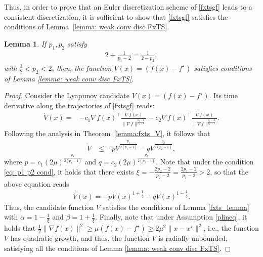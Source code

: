 \documentclass[letterpaper]{article}
\newtheorem{lemma}{Lemma} %
\begin{document}
Thus, in order to prove that an Euler discretization scheme of \eqref{fxtsgf} leads to a consistent discretization, it is sufficient to show that \eqref{fxtsgf} satisfies the conditions of Lemma~\ref{lemma: weak conv disc FxTS}.

\begin{lemma}\label{lemma:V p1 p2}
If $p_1, p_2$ satisfy
\begin{align}\label{eq: p1 p2 cond}
 2 + \frac{1}{p_1-2}  = \frac{1}{2-p_2},
\end{align}
with $\frac{3}{2}<p_2<2$, then, the function $V(x) = (f(x)-f^\star)$ satisfies conditions of Lemma \ref{lemma: weak conv disc FxTS}.
\end{lemma}
\begin{proof}
Consider the Lyapunov candidate $V(x) = (f(x)-f^\star)$. Its time derivative along the trajectories of \eqref{fxtsgf} reads:
\begin{align*}
    \dot V(x) =& -c_1\nabla f(x)^\intercal \frac{\nabla f(x)}{\|\nabla f\|^{\frac{p_2-2}{p_2-1}}}-c_2\nabla f(x)^\intercal \frac{\nabla f(x)}{\|\nabla f\|^{\frac{p_1-2}{p_1-1}}}.
\end{align*}
Following the analysis in Theorem~\ref{lemma:fxts_V}, it follows that
\begin{align*}
\dot{V} &\leq -pV^{\frac{p_1}{2(p_1-1)}} -q V^{\frac{p_2}{2(p_2-1)}},
\end{align*}
where $p= c_1 (2\mu)^{\frac{p_1}{2(p_1-1)}}$ and $q=c_2 (2\mu)^{\frac{p_2}{2(p_2-1)}}$. Note that under the condition \eqref{eq: p1 p2 cond}, it holds that there exists $\xi = -\frac{2p_2-2}{p_2-2} = \frac{2p_1-2}{p_1-2}>2$, so that the above equation reads
\begin{align*}
    \dot V(x) = -pV(x)^{1+\frac{1}{\xi}}
    -qV(x)^{1-\frac{1}{\xi}}.
\end{align*}
Thus, the candidate function $V$ satisfies the conditions of Lemma \ref{fxts_lemma} with $\alpha = 1-\frac{1}{\xi}$ and $\beta = 1+\frac{1}{\xi}$. Finally, note that under Assumption \ref{plineq}, it holds that $\frac{1}{2}\|\nabla f(x)\|^2\geq \mu (f(x)-f^\star)\geq 2\mu^2\|x-x^\star\|^2$, i.e., the function $V$ has quadratic growth, and thus, the function $V$ is radially unbounded, satisfying all the conditions of Lemma \ref{lemma: weak conv disc FxTS}.
\end{proof}
\end{document}
